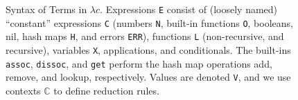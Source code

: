 

\begin{figure}
\caption{Syntax of Terms in $\lambda c$.
  Expressions \texttt{E} consist of (loosely named) ``constant'' expressions \texttt{C}
  (numbers \texttt{N}, built-in functions \texttt{O}, booleans, nil, hash maps \texttt{H}, and errors
\texttt{ERR}), 
  functions \texttt{L} (non-recursive, and recursive), variables \texttt{X}, applications,
  and conditionals.
  The built-ins \texttt{assoc}, \texttt{dissoc}, and \texttt{get} perform the
  hash map operations add, remove, and lookup, respectively.
  Values are denoted \texttt{V}, and we use contexts $\mathbb{C}$ to define reduction rules.
  }
  \label{clojure-grammar}
\end{figure}

